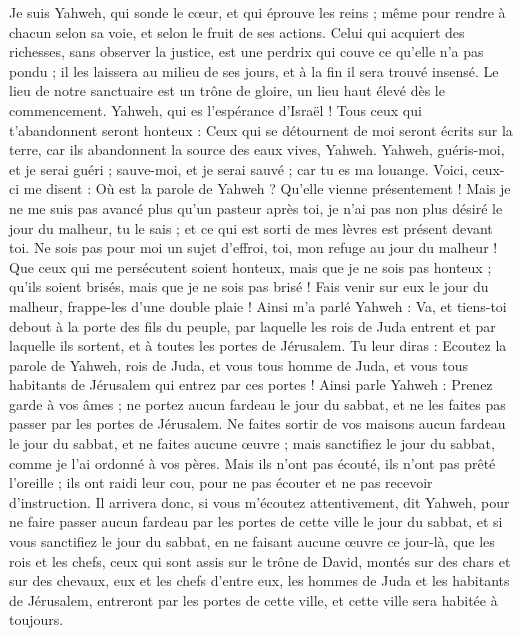 \begin{multicols}{2}
Je suis Yahweh, qui sonde le cœur, et qui éprouve les reins ; même pour rendre à chacun selon sa voie, et selon le fruit de ses actions.
Celui qui acquiert des richesses, sans observer la justice, est une perdrix qui couve ce qu'elle n'a pas pondu ; il les laissera au milieu de ses jours, et à la fin il sera trouvé insensé.
Le lieu de notre sanctuaire est un trône de gloire, un lieu haut élevé dès le commencement.
Yahweh, qui es l'espérance d'Israël ! Tous ceux qui t'abandonnent seront honteux : Ceux qui se détournent de moi seront écrits sur la terre, car ils abandonnent la source des eaux vives, Yahweh.
Yahweh, guéris-moi, et je serai guéri ; sauve-moi, et je serai sauvé ; car tu es ma louange.
Voici, ceux-ci me disent : Où est la parole de Yahweh ? Qu'elle vienne présentement !
Mais je ne me suis pas avancé plus qu’un pasteur après toi, je n'ai pas non plus désiré le jour du malheur, tu le sais ; et ce qui est sorti de mes lèvres est présent devant toi.
Ne sois pas pour moi un sujet d'effroi, toi, mon refuge au jour du malheur !
Que ceux qui me persécutent soient honteux, mais que je ne sois pas honteux ; qu'ils soient brisés, mais que je ne sois pas brisé ! Fais venir sur eux le jour du malheur, frappe-les d'une double plaie !
Ainsi m'a parlé Yahweh : Va, et tiens-toi debout à la porte des fils du peuple, par laquelle les rois de Juda entrent et par laquelle ils sortent, et à toutes les portes de Jérusalem.
Tu leur diras : Ecoutez la parole de Yahweh, rois de Juda, et vous tous homme de Juda, et vous tous habitants de Jérusalem qui entrez par ces portes !
Ainsi parle Yahweh : Prenez garde à vos âmes ; ne portez aucun fardeau le jour du sabbat, et ne les faites pas passer par les portes de Jérusalem.
Ne faites sortir de vos maisons aucun fardeau le jour du sabbat, et ne faites aucune œuvre ; mais sanctifiez le jour du sabbat, comme je l'ai ordonné à vos pères.
Mais ils n'ont pas écouté, ils n'ont pas prêté l'oreille ; ils ont raidi leur cou, pour ne pas écouter et ne pas recevoir d'instruction.
Il arrivera donc, si vous m'écoutez attentivement, dit Yahweh, pour ne faire passer aucun fardeau par les portes de cette ville le jour du sabbat, et si vous sanctifiez le jour du sabbat, en ne faisant aucune œuvre ce jour-là,
que les rois et les chefs, ceux qui sont assis sur le trône de David, montés sur des chars et sur des chevaux, eux et les chefs d'entre eux, les hommes de Juda et les habitants de Jérusalem, entreront par les portes de cette ville, et cette ville sera habitée à toujours.

\end{multicols}
